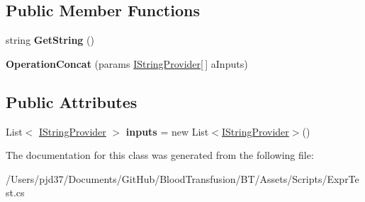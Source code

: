\subsection*{Public Member Functions}
\begin{DoxyCompactItemize}
\item 
string {\bfseries Get\+String} ()\hypertarget{class_b83_1_1_logic_expression_parser_1_1_operation_concat_a979c6f730fde95b166e53ad77ca512ce}{}\label{class_b83_1_1_logic_expression_parser_1_1_operation_concat_a979c6f730fde95b166e53ad77ca512ce}

\item 
{\bfseries Operation\+Concat} (params \hyperlink{interface_b83_1_1_logic_expression_parser_1_1_i_string_provider}{I\+String\+Provider}\mbox{[}$\,$\mbox{]} a\+Inputs)\hypertarget{class_b83_1_1_logic_expression_parser_1_1_operation_concat_a0b741e7549a08b1d57bcca1a22aba920}{}\label{class_b83_1_1_logic_expression_parser_1_1_operation_concat_a0b741e7549a08b1d57bcca1a22aba920}

\end{DoxyCompactItemize}
\subsection*{Public Attributes}
\begin{DoxyCompactItemize}
\item 
List$<$ \hyperlink{interface_b83_1_1_logic_expression_parser_1_1_i_string_provider}{I\+String\+Provider} $>$ {\bfseries inputs} = new List$<$\hyperlink{interface_b83_1_1_logic_expression_parser_1_1_i_string_provider}{I\+String\+Provider}$>$()\hypertarget{class_b83_1_1_logic_expression_parser_1_1_operation_concat_a88be408d63ce7cc01e5073a1cccc9b2f}{}\label{class_b83_1_1_logic_expression_parser_1_1_operation_concat_a88be408d63ce7cc01e5073a1cccc9b2f}

\end{DoxyCompactItemize}


The documentation for this class was generated from the following file\+:\begin{DoxyCompactItemize}
\item 
/\+Users/pjd37/\+Documents/\+Git\+Hub/\+Blood\+Transfusion/\+B\+T/\+Assets/\+Scripts/Expr\+Test.\+cs\end{DoxyCompactItemize}
